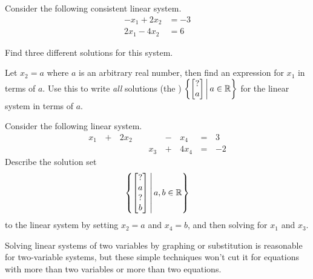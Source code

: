 \begin{applicationActivities}
\begin{activity}{10}
  Consider the following consistent linear system.
  \begin{align*}
  -x_1+2x_2  &= -3 \\
  2x_1-4x_2  &=  6
  \end{align*}
\begin{subactivity}
  Find three different solutions
  for this system.
\end{subactivity}
\begin{subactivity}
  Let \(x_2=a\) where \(a\) is an arbitrary real number, then find an
  expression for \(x_1\) in terms of \(a\). Use this to write \textit{all}
  solutions (the )
  \(
    \left\{
	\begin{bmatrix}
      ? \\
      a
    \end{bmatrix} \,\middle|\, a \in \mathbb{R}
	\right\}
  \)
  for the linear system in terms of \(a\).
\end{subactivity}
\end{activity}


\begin{activity}{10}
  Consider the following linear system.
  \begin{alignat*}{5}
    x_1 &\,+\,& 2x_2 &\, \,&     &\,-\,&  x_4 &\,=\,& 3 \\
        &\, \,&      &\, \,& x_3 &\,+\,& 4x_4 &\,=\,& -2
  \end{alignat*}
  Describe the solution set
  \[
  	\left\{
	\begin{bmatrix}
      ? \\
      a \\
      ? \\
      b
	\end{bmatrix} \,\middle|\, a,b \in \mathbb{R} \right\}
  \]
  to the linear system
  by setting \(x_2=a\) and \(x_4=b\), and then solving for \(x_1\) and
  \(x_3\).
\end{activity}

\begin{observation}
  Solving linear systems of two variables by graphing or substitution is
  reasonable for two-variable systems, but these simple techniques
  won't cut it for equations with
  more than two variables or more than two equations.
\end{observation}
\end{applicationActivities}
